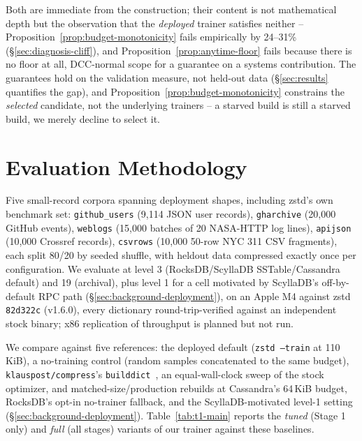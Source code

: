 \documentclass[12pt]{article}
\begin{document}
Both are immediate from the construction; their content is not
mathematical depth but the observation that the \emph{deployed} trainer
satisfies neither -- Proposition~\ref{prop:budget-monotonicity} fails
empirically by 24--31\% (\S\ref{sec:diagnosis-cliff}), and
Proposition~\ref{prop:anytime-floor} fails because there is no floor at
all, DCC-normal scope for a guarantee on a systems contribution. The
guarantees hold on the validation measure, not held-out data
(\S\ref{sec:results} quantifies the gap), and
Proposition~\ref{prop:budget-monotonicity} constrains the
\emph{selected} candidate, not the underlying trainers -- a starved
build is still a starved build, we merely decline to select it.

\section{Evaluation Methodology}
\label{sec:evaluation-methodology}

Five small-record corpora spanning deployment shapes, including zstd's
own benchmark set: \texttt{github\_users} (9{,}114 JSON user records),
\texttt{gharchive} (20{,}000 GitHub events), \texttt{weblogs} (15{,}000
batches of 20 NASA-HTTP log lines), \texttt{apijson} (10{,}000 Crossref
records), \texttt{csvrows} (10{,}000 50-row NYC 311 CSV fragments), each
split 80/20 by seeded shuffle, with heldout data compressed exactly
once per configuration. We evaluate at level 3 (RocksDB/ScyllaDB
SSTable/Cassandra default) and 19 (archival), plus level 1 for a cell
motivated by ScyllaDB's off-by-default RPC path
(\S\ref{sec:background-deployment}), on an Apple M4 against zstd
\texttt{82d322c} (v1.6.0), every dictionary round-trip-verified against
an independent stock binary; x86 replication of throughput is planned
but not run.

We compare against five references: the deployed default (\texttt{zstd
--train} at 110\,KiB), a no-training control (random samples
concatenated to the same budget), \texttt{klauspost/compress}'s
\texttt{builddict}~\cite{klauspost}, an equal-wall-clock sweep of the
stock optimizer, and matched-size/production rebuilds at Cassandra's
64\,KiB budget, RocksDB's opt-in no-trainer fallback, and the
ScyllaDB-motivated level-1 setting (\S\ref{sec:background-deployment}).
Table~\ref{tab:t1-main} reports the \emph{tuned} (Stage 1 only) and
\emph{full} (all stages) variants of our trainer against these
baselines.
\end{document}
